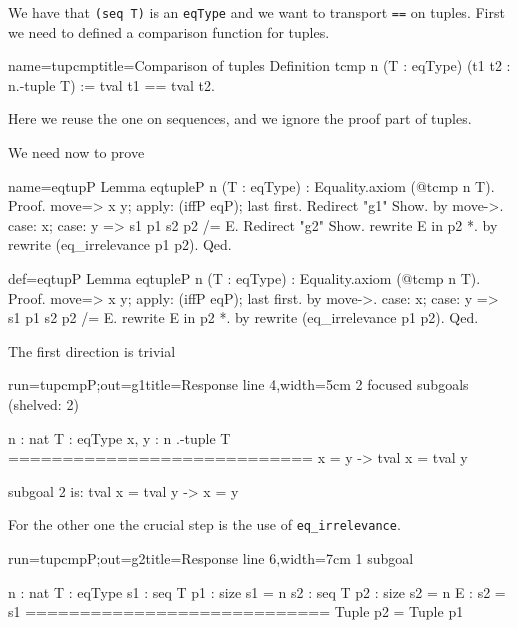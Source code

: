 \label{sec:subtypekit}

We have that \lstinline/(seq T)/ is an \lstinline/eqType/ and
we want to transport \lstinline/==/ on tuples.  First we need to
defined a comparison function for tuples.

\begin{coq}{name=tupcmp}{title=Comparison of tuples}
Definition tcmp n (T : eqType) (t1 t2 : n.-tuple T) :=
  tval t1 == tval t2.
\end{coq}

Here we reuse the one on sequences, and we ignore the
proof part of tuples.

We need now to prove

\begin{coqdef}{name=eqtupP}
Lemma eqtupleP n (T : eqType) : Equality.axiom (@tcmp n T).
Proof.
move=> x y; apply: (iffP eqP); last first.
Redirect "g1" Show.
  by move->.
case: x; case: y => s1 p1 s2 p2 /= E. Redirect "g2" Show.
rewrite E in p2 *.
by rewrite (eq_irrelevance p1 p2).
Qed.
\end{coqdef}
\begin{coq}{def=eqtupP}{}
Lemma eqtupleP n (T : eqType) : Equality.axiom (@tcmp n T).
Proof.
move=> x y; apply: (iffP eqP); last first.
  by move->.
case: x; case: y => s1 p1 s2 p2 /= E.
rewrite E in p2 *.
by rewrite (eq_irrelevance p1 p2).
Qed.
\end{coq}

The first direction is trivial

\begin{coqout}{run=tupcmpP;out=g1}{title=Response line 4,width=5cm}
2 focused subgoals (shelved: 2)

n : nat
T : eqType
x, y : n .-tuple T
============================
x = y -> tval x = tval y

subgoal 2 is:
  tval x = tval y -> x = y
\end{coqout}

For the other one the crucial step is the use
of \lstinline/eq_irrelevance/.

\begin{coqout}{run=tupcmpP;out=g2}{title=Response line 6,width=7cm}
1 subgoal

n : nat
T : eqType
s1 : seq T
p1 : size s1 = n
s2 : seq T
p2 : size s2 = n
E : s2 = s1
============================
Tuple p2 = Tuple p1
\end{coqout}

